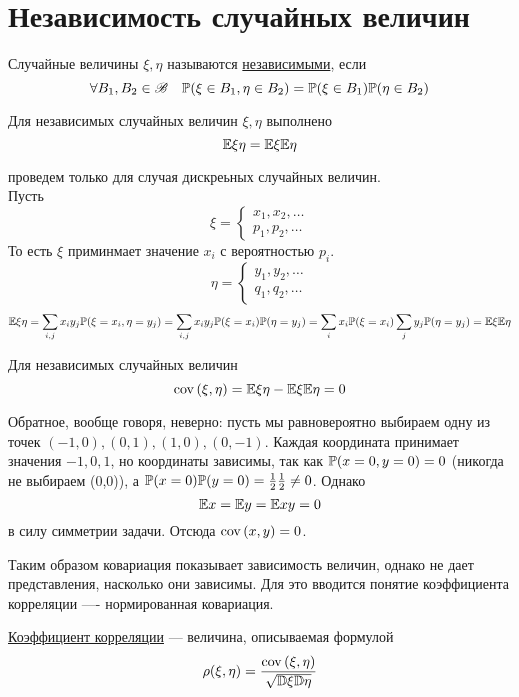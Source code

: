 \section{Независимость случайных величин}
\begin{Def}
	Случайные величины $\xi, \eta$ называются \underline{независимыми}, если 
	 $$ \forall B_1, B_2 \in \mathscr{B} \quad \mathbb{P}(\xi \in B_1, \eta \in B_2) = \mathbb{P}(\xi \in B_1)\mathbb{P}(\eta \in B_2) $$
\end{Def}

\begin{St}
Для независимых случайных величин $\xi, \eta$ выполнено
$$\mathbb{E}\xi\eta = \mathbb{E}\xi\mathbb{E}\eta$$
\end{St}
\begin{Proof}
проведем только для случая дискреьных случайных величин.\\
Пусть 
\[
   	\xi = 
  	\begin{cases}
  		x_1, x_2, \ldots \\
  		p_1, p_2, \ldots
  	\end{cases}
  \]
  То есть $\xi$ приминмает значение $x_i$ с вероятностью $p_i$.
  \[
   	\eta = 
  	\begin{cases}
  		y_1, y_2, \ldots \\
  		q_1, q_2, \ldots
  	\end{cases}
  \]
  $$\mathbb{E}\xi\eta=\sum\limits_{i,j} x_iy_j\mathbb{P}(\xi=x_i, \eta=y_j) = \sum\limits_{i,j} x_iy_j\mathbb{P}(\xi=x_i)\mathbb{P}(\eta=y_j) =  \sum\limits_{i} x_i\mathbb{P}(\xi=x_i)\sum\limits_j y_j\mathbb{P}(\eta=y_j) = \mathbb{E}\xi\mathbb{E}\eta$$
\end{Proof}

Для независимых случайных величин
$${\rm cov \,}(\xi,\eta) = \mathbb{E}\xi\eta - \mathbb{E}\xi\mathbb{E}\eta = 0$$

Обратное, вообще говоря, неверно: пусть мы равновероятно выбираем одну из точек $(-1, 0), (0, 1), (1, 0), (0, -1)$. Каждая координата принимает значения $-1, 0, 1$, но координаты зависимы, так как $\mathbb{P}(x=0,  y=0) = 0$ (никогда не выбираем (0,0)), а $\mathbb{P}(x=0)\mathbb{P}(y=0) = \frac12\frac12 \not=0$. Однако
$$\mathbb{E} x = \mathbb{E} y = \mathbb{E} xy = 0$$ в силу симметрии задачи. Отсюда ${\rm cov \,}(x,y) = 0$.

Таким образом ковариация показывает зависимость величин, однако не дает представления, насколько они зависимы. Для это вводится понятие коэффициента корреляции ---- нормированная ковариация.

\begin{Def}
\underline{Коэффициент корреляции} --- величина, описываемая формулой
$$\rho(\xi, \eta) = \frac{{\rm cov \,}(\xi, \eta)}{\sqrt{\mathbb{D}\xi\mathbb{D}\eta}}$$
\end{Def}

